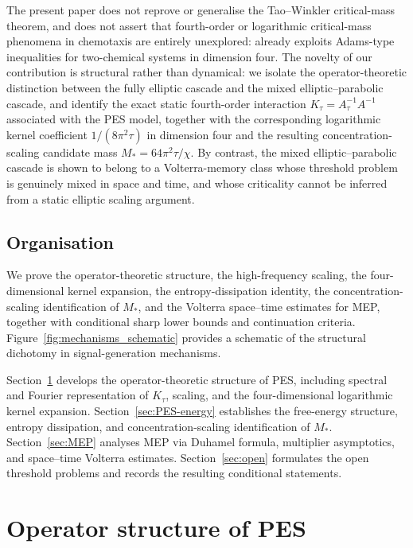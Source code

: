\documentclass[11pt,reqno]{amsart}
\theoremstyle{definition}
\theoremstyle{remark}
\begin{document}
The present paper does not reprove or generalise the Tao--Winkler critical-mass theorem, and does not assert that fourth-order or logarithmic critical-mass phenomena in chemotaxis are entirely unexplored: \cite{fujie2017application} already exploits Adams-type inequalities for two-chemical systems in dimension four. The novelty of our contribution is structural rather than dynamical: we isolate the operator-theoretic distinction between the fully elliptic cascade and the mixed elliptic--parabolic cascade, and identify the exact static fourth-order interaction $K_\tau=A_\tau^{-1}A^{-1}$ associated with the PES model, together with the corresponding logarithmic kernel coefficient $1/(8\pi^{2}\tau)$ in dimension four and the resulting concentration-scaling candidate mass $M_{\!*}=64\pi^{2}\tau/\chi$. By contrast, the mixed elliptic--parabolic cascade is shown to belong to a Volterra-memory class whose threshold problem is genuinely mixed in space and time, and whose criticality cannot be inferred from a static elliptic scaling argument.

\subsection{Organisation}

We prove the operator-theoretic structure, the high-frequency scaling, the four-dimensional kernel expansion, the entropy-dissipation identity, the concentration-scaling identification of $M_{\!*}$, and the Volterra space--time estimates for MEP, together with conditional sharp lower bounds and continuation criteria. Figure~\ref{fig:mechanisms_schematic} provides a schematic of the structural dichotomy in signal-generation mechanisms.

Section~\ref{sec:PES} develops the operator-theoretic structure of PES, including spectral and Fourier representation of $K_\tau$, scaling, and the four-dimensional logarithmic kernel expansion. Section~\ref{sec:PES-energy} establishes the free-energy structure, entropy dissipation, and concentration-scaling identification of $M_{\!*}$. Section~\ref{sec:MEP} analyses MEP via Duhamel formula, multiplier asymptotics, and space--time Volterra estimates. Section~\ref{sec:open} formulates the open threshold problems and records the resulting conditional statements.

\section{Operator structure of PES}
\label{sec:PES}
\end{document}

